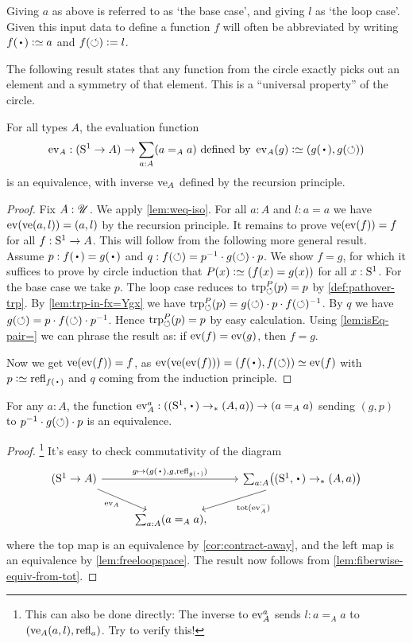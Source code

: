 Giving $a$ as above is referred to as `the base case', and
giving $l$ as `the loop case'. Given this input data to define
a function $f$ will often be abbreviated by writing
$f(\base)\defeq a$ and $f(\circlearrowleft)\mathrel{\vcentcolon=} l$.

The following result states that any function from the circle exactly
picks out an element and a symmetry of that element.
This is a ``universal property'' of the circle.

\begin{theorem}\label{lem:freeloopspace}
For all types $A$, the evaluation function
\[
\ev_A : (\Sc\to A)\to \sum_{a:A}(a=_Aa)\text{~defined by~}
\ev_A(g)\defeq (g(\base),g(\Sloop))
\]
is an equivalence, with inverse $\ve_A$ defined by the recursion principle.
\end{theorem}
\begin{proof}
Fix $A:{\mathscr{U}}$. We apply \cref{lem:weq-iso}.
For all $a:A$ and $l:a=a$ we have $\ev(\ve(a,l))=(a,l)$
by the recursion principle. It remains to prove
$\ve(\ev(f))=f$ for all $f:{\mathrm{S}^1}\to A$. This will follow
from the following more general result. Assume
$p: f(\base)= g(\base)$ and $q: f(\circlearrowleft) = p^{-1}\cdot g(\circlearrowleft)\cdot p$.
We show $f=g$, for which it suffices to prove by circle induction
that $P(x)\defeq(f(x)=g(x))$ for all $x:{\mathrm{S}^1}$.
For the base case we take $p$.
The loop case reduces to $\trp[P]{\Sloop}(p)=p$ by \cref{def:pathover-trp}.
By \cref{lem:trp-in-fx=Ygx} we have
$\trp[P]{\Sloop}(p)=g(\Sloop)\cdot p \cdot f(\Sloop)^{-1}$.
By $q$ we have $g(\circlearrowleft) = p\cdot f(\circlearrowleft) \cdot p^{-1}$.
Hence $\trp[P]{\Sloop}(p)=p$ by easy calculation.
Using \cref{lem:isEq-pair=} we can phrase the result
as: if $\ev(f)=\ev(g)$, then  $f=g$.

Now we get $\ve(\ev(f))=f$, as
$\ev(\ve(\ev(f)))=(f(\base),f(\Sloop))\jdeq\ev(f)$ with $p\defeq\refl{f(\base)}$
and $q$ coming from the induction principle.
\end{proof}
\begin{corollary}\label{cor:circle-loopspace}
  For any $a:A$, the function $\ev_A^a:((\Sc,\base)\to_* (A,a))\to (a=_Aa)$
  sending $(g,p)$ to $p^{-1}\cdot g(\circlearrowleft)\cdot p$ is an equivalence.
\end{corollary}
\begin{proof}\hskip-5pt\footnote{%
    This can also be done directly:
    The inverse to $\ev_A^a$ sends $l : a=_Aa$
    to $(\ve_A(a,l), \refl{a})$.
    Try to verify this!}
It's easy to check commutativity of the diagram
\[
  \begin{tikzcd}
    (\Sc \to A) \ar[rr,"{g\mapsto(g(\base),g,\refl{g(\base)})}"]
    \ar[dr,"\ev_A"'] & &
    \sum_{a:A}\bigl((\Sc,\base) \ptdto (A,a)\bigr)
    \ar[dl,"\tot(\ev_A^-)"] \\
    &  \,\sum_{a:A}(a=_A a),
  \end{tikzcd}
\]
where the top map is an equivalence by \cref{cor:contract-away},
and the left map is an equivalence by \cref{lem:freeloopspace}.
The result now follows from \cref{lem:fiberwise-equiv-from-tot}.
\end{proof}

